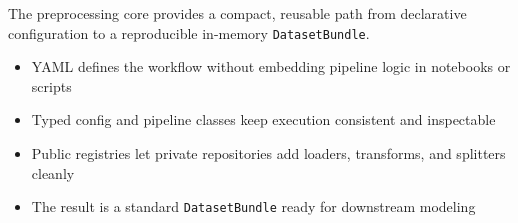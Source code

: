\begin{frame}[plain]

  \vspace{16mm}
  {\small The preprocessing core provides a compact, reusable path from declarative configuration to a reproducible in-memory \texttt{DatasetBundle}.}\par

  \vspace{4mm}
  \begin{itemize}
    \item YAML defines the workflow without embedding pipeline logic in notebooks or scripts
    \item Typed config and pipeline classes keep execution consistent and inspectable
    \item Public registries let private repositories add loaders, transforms, and splitters cleanly
    \item The result is a standard \texttt{DatasetBundle} ready for downstream modeling
  \end{itemize}


  \setmainframenumber
  \slideheaderfooter
\end{frame}
